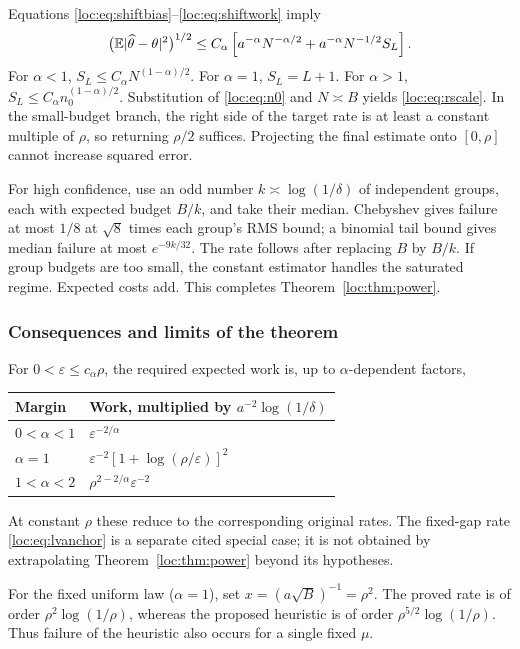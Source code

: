 Equations \eqref{loc:eq:shiftbias}--\eqref{loc:eq:shiftwork} imply
\begin{equation}\label{loc:eq:upperwork}
 \bigl(\mathbb E|\widehat\theta-\theta|^2\bigr)^{1/2}
 \le C_\alpha\left[a^{-\alpha}N^{-\alpha/2}
       +a^{-\alpha}N^{-1/2}S_L\right].
\end{equation}
For $\alpha<1$, $S_L\le C_\alpha N^{(1-\alpha)/2}$. For $\alpha=1$, $S_L=L+1$. For $\alpha>1$, $S_L\le C_\alpha n_0^{(1-\alpha)/2}$. Substitution of \eqref{loc:eq:n0} and $N\asymp B$ yields \eqref{loc:eq:rscale}. In the small-budget branch, the right side of the target rate is at least a constant multiple of $\rho$, so returning $\rho/2$ suffices. Projecting the final estimate onto $[0,\rho]$ cannot increase squared error.

For high confidence, use an odd number $k\asymp\log(1/\delta)$ of independent groups, each with expected budget $B/k$, and take their median. Chebyshev gives failure at most $1/8$ at $\sqrt8$ times each group's RMS bound; a binomial tail bound gives median failure at most $e^{-9k/32}$. The rate follows after replacing $B$ by $B/k$. If group budgets are too small, the constant estimator handles the saturated regime. Expected costs add. This completes Theorem~\ref{loc:thm:power}.

\subsubsection{Consequences and limits of the theorem}
For $0<\varepsilon\le c_\alpha\rho$, the required expected work is, up to $\alpha$-dependent factors,
\begin{center}\begin{tabular}{ll}\toprule
Margin & Work, multiplied by $a^{-2}\log(1/\delta)$\\\midrule
$0<\alpha<1$ & $\varepsilon^{-2/\alpha}$\\
$\alpha=1$ & $\varepsilon^{-2}[1+\log(\rho/\varepsilon)]^2$\\
$1<\alpha<2$ & $\rho^{2-2/\alpha}\varepsilon^{-2}$\\\bottomrule
\end{tabular}\end{center}
At constant $\rho$ these reduce to the corresponding original rates. The fixed-gap rate \eqref{loc:eq:lvanchor} is a separate cited special case; it is not obtained by extrapolating Theorem~\ref{loc:thm:power} beyond its hypotheses.

For the fixed uniform law ($\alpha=1$), set $x=(a\sqrt B)^{-1}=\rho^2$. The proved rate is of order $\rho^2\log(1/\rho)$, whereas the proposed heuristic is of order $\rho^{5/2}\log(1/\rho)$. Thus failure of the heuristic also occurs for a single fixed $\mu$.

